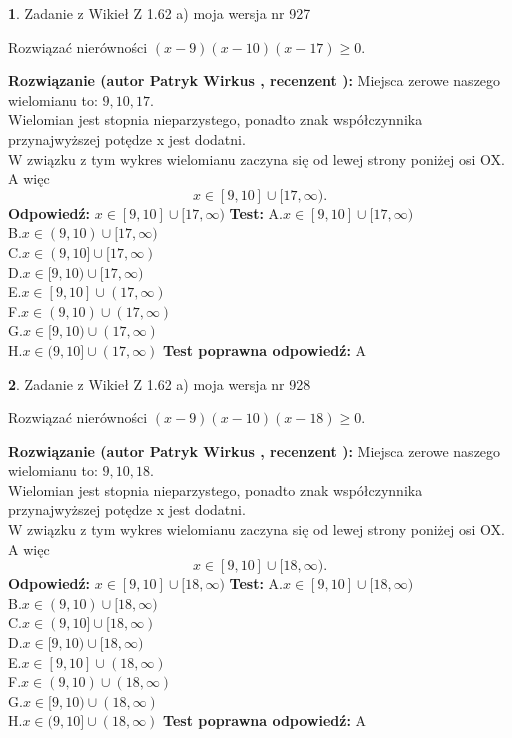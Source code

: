 \documentclass[12pt, a4paper]{article}
\theoremstyle{definition} %
\newtheorem{zad}{}
\newcommand{\zadStart}[1]{\begin{zad}#1\newline}
\newcommand{\zadStop}{\end{zad}}
\newcommand{\rozwStart}[2]{\noindent \textbf{Rozwiązanie (autor #1 , recenzent #2): }\newline}
\newcommand{\rozwStop}{\newline}
\newcommand{\odpStart}{\noindent \textbf{Odpowiedź:}\newline}
\newcommand{\odpStop}{\newline}
\newcommand{\testStart}{\noindent \textbf{Test:}\newline}
\newcommand{\testStop}{\newline}
\newcommand{\kluczStart}{\noindent \textbf{Test poprawna odpowiedź:}\newline}
\newcommand{\kluczStop}{\newline}
\begin{document}
\zadStart{Zadanie z Wikieł Z 1.62 a) moja wersja nr 927}

Rozwiązać nierówności $(x-9)(x-10)(x-17)\ge0$.
\zadStop
\rozwStart{Patryk Wirkus}{}
Miejsca zerowe naszego wielomianu to: $9, 10, 17$.\\
Wielomian jest stopnia nieparzystego, ponadto znak współczynnika przy\linebreak najwyższej potędze x jest dodatni.\\ W związku z tym wykres wielomianu zaczyna się od lewej strony poniżej osi OX. A więc $$x \in [9,10] \cup [17,\infty).$$
\rozwStop
\odpStart
$x \in [9,10] \cup [17,\infty)$
\odpStop
\testStart
A.$x \in [9,10] \cup [17,\infty)$\\
B.$x \in (9,10) \cup [17,\infty)$\\
C.$x \in (9,10] \cup [17,\infty)$\\
D.$x \in [9,10) \cup [17,\infty)$\\
E.$x \in [9,10] \cup (17,\infty)$\\
F.$x \in (9,10) \cup (17,\infty)$\\
G.$x \in [9,10) \cup (17,\infty)$\\
H.$x \in (9,10] \cup (17,\infty)$
\testStop
\kluczStart
A
\kluczStop



\zadStart{Zadanie z Wikieł Z 1.62 a) moja wersja nr 928}

Rozwiązać nierówności $(x-9)(x-10)(x-18)\ge0$.
\zadStop
\rozwStart{Patryk Wirkus}{}
Miejsca zerowe naszego wielomianu to: $9, 10, 18$.\\
Wielomian jest stopnia nieparzystego, ponadto znak współczynnika przy\linebreak najwyższej potędze x jest dodatni.\\ W związku z tym wykres wielomianu zaczyna się od lewej strony poniżej osi OX. A więc $$x \in [9,10] \cup [18,\infty).$$
\rozwStop
\odpStart
$x \in [9,10] \cup [18,\infty)$
\odpStop
\testStart
A.$x \in [9,10] \cup [18,\infty)$\\
B.$x \in (9,10) \cup [18,\infty)$\\
C.$x \in (9,10] \cup [18,\infty)$\\
D.$x \in [9,10) \cup [18,\infty)$\\
E.$x \in [9,10] \cup (18,\infty)$\\
F.$x \in (9,10) \cup (18,\infty)$\\
G.$x \in [9,10) \cup (18,\infty)$\\
H.$x \in (9,10] \cup (18,\infty)$
\testStop
\kluczStart
A
\kluczStop
\end{document}
